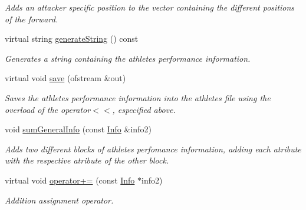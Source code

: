 \begin{DoxyCompactItemize}
\begin{DoxyCompactList}\small\item\em Adds an attacker specific position to the vector containing the different positions of the forward. \end{DoxyCompactList}\item 
virtual string \hyperlink{class_info_a5e52b35a9c17b58222bb57af16c16ce3}{generate\+String} () const
\begin{DoxyCompactList}\small\item\em Generates a string containing the athlete\textquotesingle{}s performance information. \end{DoxyCompactList}\item 
virtual void \hyperlink{class_info_a7b18f01c7cef1a219d3adb6677f3475f}{save} (ofstream \&out)
\begin{DoxyCompactList}\small\item\em Saves the athlete\textquotesingle{}s performance information into the athlete\textquotesingle{}s file using the overload of the operator$<$$<$, especified above. \end{DoxyCompactList}\item 
void \hyperlink{class_info_a9c2e39f8cfbe6d070d1154313fe0dd2e}{sum\+General\+Info} (const \hyperlink{class_info}{Info} \&info2)
\begin{DoxyCompactList}\small\item\em Adds two different blocks of athlete\textquotesingle{}s perfomance information, adding each atribute with the respective atribute of the other block. \end{DoxyCompactList}\item 
virtual void \hyperlink{class_info_a35d820d35f8ab3b8de15cdfc07f0c5a4}{operator+=} (const \hyperlink{class_info}{Info} $\ast$info2)
\begin{DoxyCompactList}\small\item\em Addition assignment operator. \end{DoxyCompactList}\end{DoxyCompactItemize}
